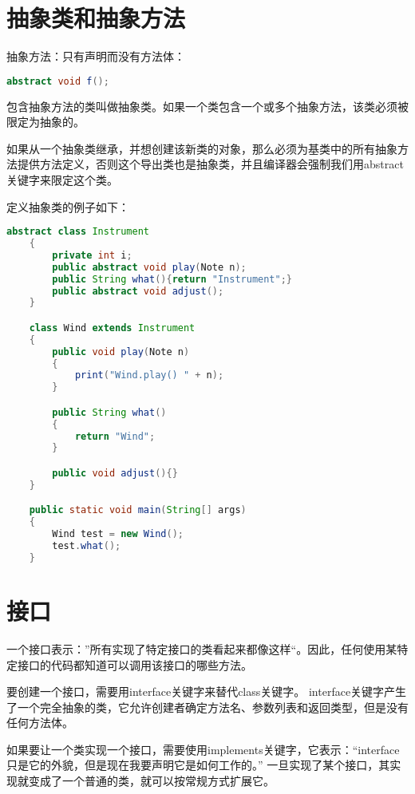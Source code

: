 \documentclass[a4paper,left=2.5cm,right=2.5cm,11pt]{article}
\begin{document}
\tableofcontents

\clearpage

\section{抽象类和抽象方法}
	抽象方法：只有声明而没有方法体：
	\begin{lstlisting}[language = java]
	abstract void f();
	\end{lstlisting}

	包含抽象方法的类叫做抽象类。如果一个类包含一个或多个抽象方法，该类必须被限定为抽象的。\par

	如果从一个抽象类继承，并想创建该新类的对象，那么必须为基类中的所有抽象方法提供方法定义，否则这个导出类也是抽象类，并且编译器会强制我们用abstract关键字来限定这个类。\par

	定义抽象类的例子如下：
	\begin{lstlisting}[language = java]
	abstract class Instrument
	{
		private int i;
		public abstract void play(Note n);
		public String what(){return "Instrument";}
		public abstract void adjust();
	}

	class Wind extends Instrument
	{
		public void play(Note n)
		{
			print("Wind.play() " + n);
		}

		public String what()
		{
			return "Wind";
		}

		public void adjust(){}
	}

	public static void main(String[] args)
	{
		Wind test = new Wind();
		test.what();
	}
	\end{lstlisting}

\section{接口}
	一个接口表示：”所有实现了特定接口的类看起来都像这样“。因此，任何使用某特定接口的代码都知道可以调用该接口的哪些方法。\par

	要创建一个接口，需要用interface关键字来替代class关键字。
	interface关键字产生了一个完全抽象的类，它允许创建者确定方法名、参数列表和返回类型，但是没有任何方法体。\par

	如果要让一个类实现一个接口，需要使用implements关键字，它表示：“interface只是它的外貌，但是现在我要声明它是如何工作的。”
	一旦实现了某个接口，其实现就变成了一个普通的类，就可以按常规方式扩展它。\par
\end{document}
